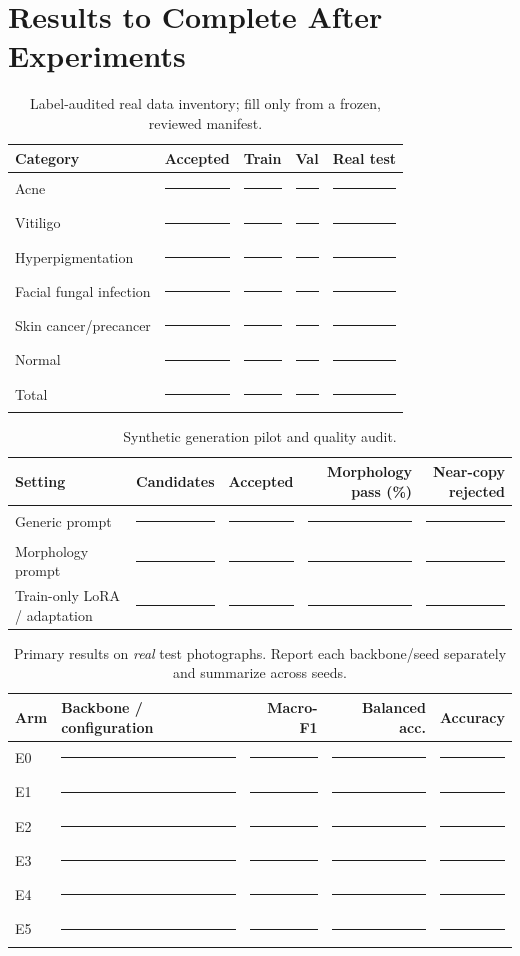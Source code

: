 \documentclass[11pt,a4paper]{article}
\newcommand{\blank}{\rule{0.72cm}{0.32pt}}
\begin{document}
\section{Results to Complete After Experiments}
\begin{table}[ht]\centering\small\caption{Label-audited real data inventory; fill only from a frozen, reviewed manifest.}
\begin{tabularx}{\linewidth}{Xrrrr}\toprule Category & Accepted & Train & Val & Real test\\\midrule
Acne & \blank & \blank & \blank & \blank\\
Vitiligo & \blank & \blank & \blank & \blank\\
Hyperpigmentation & \blank & \blank & \blank & \blank\\
Facial fungal infection & \blank & \blank & \blank & \blank\\
Skin cancer/precancer & \blank & \blank & \blank & \blank\\
Normal & \blank & \blank & \blank & \blank\\
Total & \blank & \blank & \blank & \blank\\\bottomrule\end{tabularx}\end{table}

\begin{table}[ht]\centering\small\caption{Synthetic generation pilot and quality audit.}
\begin{tabularx}{\linewidth}{Xrrrr}\toprule Setting & Candidates & Accepted & Morphology pass (\%) & Near-copy rejected\\\midrule
Generic prompt & \blank & \blank & \blank & \blank\\
Morphology prompt & \blank & \blank & \blank & \blank\\
Train-only LoRA / adaptation & \blank & \blank & \blank & \blank\\\bottomrule\end{tabularx}\end{table}

\begin{table}[ht]\centering\small\caption{Primary results on \emph{real} test photographs. Report each backbone/seed separately and summarize across seeds.}
\begin{tabularx}{\linewidth}{lXrrr}\toprule Arm & Backbone / configuration & Macro-F1 & Balanced acc. & Accuracy\\\midrule
E0 & \blank & \blank & \blank & \blank\\
E1 & \blank & \blank & \blank & \blank\\
E2 & \blank & \blank & \blank & \blank\\
E3 & \blank & \blank & \blank & \blank\\
E4 & \blank & \blank & \blank & \blank\\
E5 & \blank & \blank & \blank & \blank\\\bottomrule\end{tabularx}\end{table}
\end{document}
